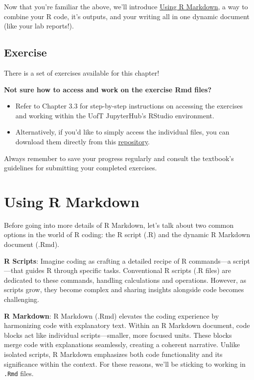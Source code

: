 \documentclass[
]{book}
\begin{document}
Now that you're familiar the above, we'll introduce \protect\hyperlink{using-r-markdown}{Using R Markdown}, a way to combine your R code, it's outputs, and your writing all in one dynamic document (like your lab reports!).

\hypertarget{exercise-3}{%
\section{Exercise}\label{exercise-3}}

There is a set of exercises available for this chapter!

\textbf{Not sure how to access and work on the exercise Rmd files? }

\begin{itemize}
\item
  Refer to Chapter 3.3 for step-by-step instructions on accessing the exercises and working within the UofT JupyterHub's RStudio environment.
\item
  Alternatively, if you'd like to simply access the individual files, you can download them directly from this \href{https://github.com/UofTChem-Teaching/R4EnvChem-Exercises}{repository}.
\end{itemize}

Always remember to save your progress regularly and consult the textbook's guidelines for submitting your completed exercises.

\hypertarget{using-r-markdown}{%
\chapter{Using R Markdown}\label{using-r-markdown}}

Before going into more details of R Markdown, let's talk about two common options in the world of R coding: the R script (.R) and the dynamic R Markdown document (.Rmd).

\textbf{R Scripts}: Imagine coding as crafting a detailed recipe of R commands---a script---that guides R through specific tasks. Conventional R scripts (.R files) are dedicated to these commands, handling calculations and operations. However, as scripts grow, they become complex and sharing insights alongside code becomes challenging.

\textbf{R Markdown}: R Markdown (.Rmd) elevates the coding experience by harmonizing code with explanatory text. Within an R Markdown document, code blocks act like individual scripts---smaller, more focused units. These blocks merge code with explanations seamlessly, creating a coherent narrative. Unlike isolated scripts, R Markdown emphasizes both code functionality and its significance within the context. For these reasons, we'll be sticking to working in \texttt{.Rmd} files.
\end{document}
